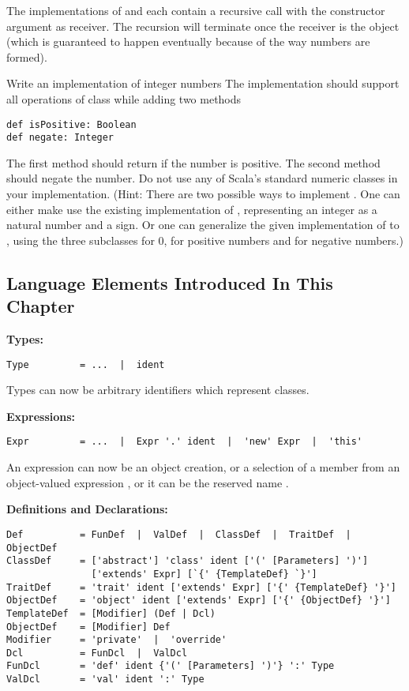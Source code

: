 The implementations of \code{+} and \code{-} each contain a recursive
call with the constructor argument as receiver. The recursion will
terminate once the receiver is the  object (which is
guaranteed to happen eventually because of the way numbers are formed).

\begin{exercise} Write an implementation  of integer numbers
The implementation should support all operations of class 
while adding two methods
\begin{lstlisting}
def isPositive: Boolean
def negate: Integer
\end{lstlisting}
The first method should return  if the number is positive. The second method should negate the number.
Do not use any of Scala's standard numeric classes in your
implementation. (Hint: There are two possible ways to implement
. One can either make use the existing implementation of
, representing an integer as a natural number and a sign.
Or one can generalize the given implementation of  to
, using the three subclasses  for 0, 
 for positive numbers and  for negative numbers.)
\end{exercise}



\subsection*{Language Elements Introduced In This Chapter}

\textbf{Types:}
\begin{lstlisting}
Type         = ...  |  ident
\end{lstlisting}

Types can now be arbitrary identifiers which represent classes.

\textbf{Expressions:}
\begin{lstlisting}
Expr         = ...  |  Expr '.' ident  |  'new' Expr  |  'this'
\end{lstlisting}

An expression can now be an object creation, or
a selection  of a member 
from an object-valued expression , or it can be the reserved name .

\textbf{Definitions and Declarations:}
\begin{lstlisting}
Def          = FunDef  |  ValDef  |  ClassDef  |  TraitDef  |  ObjectDef
ClassDef     = ['abstract'] 'class' ident ['(' [Parameters] ')'] 
               ['extends' Expr] [`{' {TemplateDef} `}']
TraitDef     = 'trait' ident ['extends' Expr] ['{' {TemplateDef} '}']
ObjectDef    = 'object' ident ['extends' Expr] ['{' {ObjectDef} '}']
TemplateDef  = [Modifier] (Def | Dcl)
ObjectDef    = [Modifier] Def
Modifier     = 'private'  |  'override'
Dcl          = FunDcl  |  ValDcl
FunDcl       = 'def' ident {'(' [Parameters] ')'} ':' Type
ValDcl       = 'val' ident ':' Type
\end{lstlisting}

